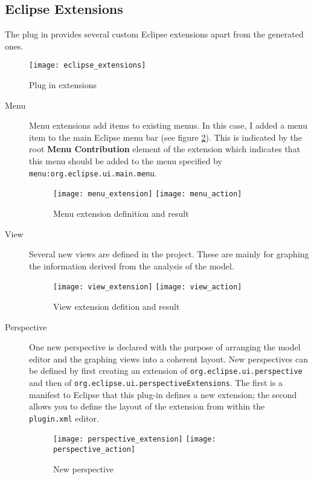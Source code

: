 \subsection{Eclipse Extensions}
The plug in provides several custom Eclipse extensions apart from the generated ones.
\begin{figure}[h]
    \texttt{[image: eclipse\_extensions]}
    \caption{Plug in extensions}
    \label{fig:eclipse_extensions}
\end{figure}
\begin{description}
    \item[Menu] Menu extensions add items to existing menus. In this case, I added a menu item
    to the main Eclipse menu bar (see figure \ref{fig:menu_extension}). This is indicated by the root \textbf{Menu Contribution} element
    of the extension which indicates that this menu should be added to the menu specified by
    \texttt{menu:org.eclipse.ui.main.menu}.
    \begin{figure}[h]
        \texttt{[image: menu\_extension]}
        \texttt{[image: menu\_action]}
        \caption{Menu extension definition and result}
        \label{fig:menu_extension}
    \end{figure}
    \item[View] Several new views are defined in the project. These are mainly for graphing
    the information derived from the analysis of the model.
    \begin{figure}[h]
        \texttt{[image: view\_extension]}
        \texttt{[image: view\_action]}
        \caption{View extension defition and result}
        \label{view_extension}
    \end{figure}
    \item[Perspective] One new perspective is declared with the purpose of arranging the model editor and the 
    graphing views into a coherent layout. New perspectives can be defined by first creating an extension of
    \texttt{org.eclipse.ui.perspective} and then of \texttt{org.eclipse.ui.perspectiveExtensions}. The
    first is a manifest to Eclipse that this plug-in defines a new extension; the second allows you
    to define the layout of the extension from within the \texttt{plugin.xml} editor. 
    \begin{figure}[h]
	\texttt{[image: perspective\_extension]}
	\texttt{[image: perspective\_action]}
	\caption{New perspective}
    \end{figure}


\end{description}


